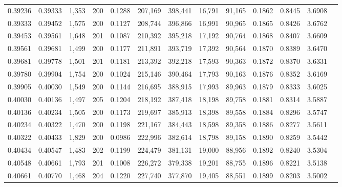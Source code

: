 \begin{tabular}{rrrrrrrrrrrrr}
0.39236 & 0.39333 & 1,353 & 200 &                                     0.1288 & 207,169 & 398,441 &  16,791 &  91,165 & 0.1862 & 0.8445 & 3.6908 \\
0.39333 & 0.39452 & 1,575 & 200 &                                     0.1127 & 208,744 & 396,866 &  16,991 &  90,965 & 0.1865 & 0.8426 & 3.6762 \\
0.39453 & 0.39561 & 1,648 & 201 &                                     0.1087 & 210,392 & 395,218 &  17,192 &  90,764 & 0.1868 & 0.8407 & 3.6609 \\
0.39561 & 0.39681 & 1,499 & 200 &                                     0.1177 & 211,891 & 393,719 &  17,392 &  90,564 & 0.1870 & 0.8389 & 3.6470 \\
0.39681 & 0.39778 & 1,501 & 201 &                                     0.1181 & 213,392 & 392,218 &  17,593 &  90,363 & 0.1872 & 0.8370 & 3.6331 \\
0.39780 & 0.39904 & 1,754 & 200 &                                     0.1024 & 215,146 & 390,464 &  17,793 &  90,163 & 0.1876 & 0.8352 & 3.6169 \\
0.39905 & 0.40030 & 1,549 & 200 &                                     0.1144 & 216,695 & 388,915 &  17,993 &  89,963 & 0.1879 & 0.8333 & 3.6025 \\
0.40030 & 0.40136 & 1,497 & 205 &                                     0.1204 & 218,192 & 387,418 &  18,198 &  89,758 & 0.1881 & 0.8314 & 3.5887 \\
0.40136 & 0.40234 & 1,505 & 200 &                                     0.1173 & 219,697 & 385,913 &  18,398 &  89,558 & 0.1884 & 0.8296 & 3.5747 \\
0.40234 & 0.40322 & 1,470 & 200 &                                     0.1198 & 221,167 & 384,443 &  18,598 &  89,358 & 0.1886 & 0.8277 & 3.5611 \\
0.40322 & 0.40433 & 1,829 & 200 &                                     0.0986 & 222,996 & 382,614 &  18,798 &  89,158 & 0.1890 & 0.8259 & 3.5442 \\
0.40434 & 0.40547 & 1,483 & 202 &                                     0.1199 & 224,479 & 381,131 &  19,000 &  88,956 & 0.1892 & 0.8240 & 3.5304 \\
0.40548 & 0.40661 & 1,793 & 201 &                                     0.1008 & 226,272 & 379,338 &  19,201 &  88,755 & 0.1896 & 0.8221 & 3.5138 \\
0.40661 & 0.40770 & 1,468 & 204 &                                     0.1220 & 227,740 & 377,870 &  19,405 &  88,551 & 0.1899 & 0.8203 & 3.5002 \\

\end{tabular}

